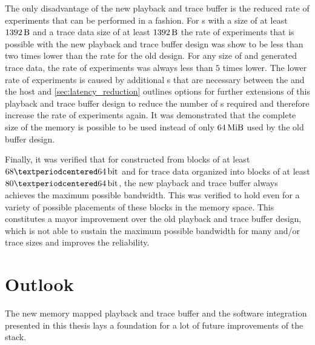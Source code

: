 The only disadvantage of the new playback and trace buffer is the reduced rate of experiments that can be performed in a \HWinTheLoop{} fashion.
For \PlaybackProgram{}s with a size of at least $\SI{1392}{\byte}$ and a trace data size of at least $\SI{1392}{\byte}$ the rate of experiments that is possible with the new playback and trace buffer design was show to be less than two times lower than the rate for the old design. For any size of \PlaybackProgram{} and generated trace data, the rate of experiments was always less than $5$ times lower. The lower rate of experiments is caused by
additional \rtt{}s that are necessary between the \FPGA{} and the host and \autoref{sec:latency_reduction} outlines options for further extensions of this playback and trace buffer design to reduce the number of \rtt{}s required and therefore increase the rate of experiments again.
It was demonstrated that the complete size of the \DDR{} memory is possible to be used instead of only $\SI{64}{\mebi\byte}$ used by the old buffer design.

Finally, it was verified that for \PlaybackProgram{} constructed from blocks of at least $\num{68}·\PhyWordSize{}$ and for trace data organized into blocks of at least $\num{80}·\PhyWordSize{}$, the new playback and trace buffer always achieves the maximum possible bandwidth. This was verified to hold even for a variety of possible placements of these blocks in the \DDR{} memory space.
This constitutes a mayor improvement over the old playback and trace buffer design, which is not able to sustain the maximum possible bandwidth for many \PlaybackProgram{} and/or trace sizes and improves the reliability.

\section{Outlook}\label{sec:outlook}
The new memory mapped playback and trace buffer and the software integration presented in this thesis lays a foundation for a lot of future improvements of the \BSS{} stack.
